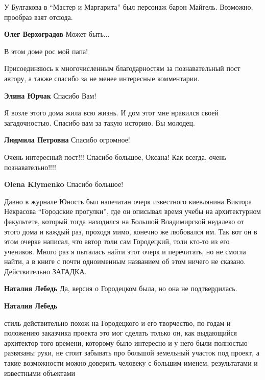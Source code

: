 \begin{itemize}
\begin{itemize}
У Булгакова в \enquote{Мастер и Маргарита} был персонаж барон Майгель. Возможно, прообраз взят отсюда.

\textbf{Олег Верхоградов} Может быть...
\end{itemize} %

В этом доме рос мой папа!


Присоединяюсь к многочисленным благодарностям за познавательный пост автору, а
также спасибо за не менее интересные комментарии.

\textbf{Элина Юрчак} Спасибо Вам!


Я возле этого дома жила всю жизнь. И дом этот мне нравился своей загадочностью.
Спасибо вам за такую историю. Вы молодец.

\textbf{Людмила Петровна} Спасибо огромное!

Очень интересный пост!!! Спасибо большое, Оксана! Как всегда, очень познавательно!!!!

\textbf{Olena Klymenko} Спасибо большое!


Давно в журнале Юность был напечатан очерк известного киевлянина Виктора
Некрасова \enquote{Городские прогулки}, где он описывал время учебы на архитектурном
факультете, который тогда находился на Большой Владимирской недалеко от этого
дома и каждый раз, проходя мимо, конечно же любовался им. Так вот он в этом
очерке написал, что автор толи сам Городецкий, толи кто-то из его учеников.
Много раз я пыталась найти этот очерк и перечитать, но не смогла найти, а в
книге с почти одноименным названием об этом ничего не сказано. Действительно
ЗАГАДКА.

\begin{itemize} %
\textbf{Наталия Лебедь} Да, версия о Городецком была, но она не подтвердилась.

\textbf{Наталия Лебедь} 

стиль действительно похож на Городецкого и его творчество, по годам и положению
заказчика проекта это мог сделать только он, как выдающийся архитектор того
времени, которому было интересно и у него были полностью развязаны руки, не
стоит забывать про большой земельный участок под проект, а такие возможности
можно доверить человеку с большим именем, результатами и известными объектами


\end{itemize}
\end{itemize}
